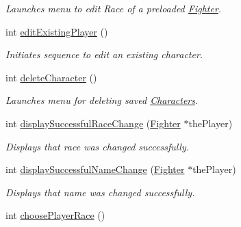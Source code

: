 \begin{DoxyCompactItemize}
\begin{DoxyCompactList}\small\item\em Launches menu to edit Race of a preloaded \hyperlink{class_fighter}{Fighter}. \end{DoxyCompactList}\item 
\hypertarget{class_game_loops_a113c1d86e74ed13427ce64438da0890a}{}\label{class_game_loops_a113c1d86e74ed13427ce64438da0890a} 
int \hyperlink{class_game_loops_a113c1d86e74ed13427ce64438da0890a}{edit\+Existing\+Player} ()
\begin{DoxyCompactList}\small\item\em Initiates sequence to edit an existing character. \end{DoxyCompactList}\item 
\hypertarget{class_game_loops_a8c82a46d75e472ae2fc76521c47e4e73}{}\label{class_game_loops_a8c82a46d75e472ae2fc76521c47e4e73} 
int \hyperlink{class_game_loops_a8c82a46d75e472ae2fc76521c47e4e73}{delete\+Character} ()
\begin{DoxyCompactList}\small\item\em Launches menu for deleting saved \hyperlink{class_characters}{Characters}. \end{DoxyCompactList}\item 
\hypertarget{class_game_loops_a1443019872f1a8082e896c7ca2f35b70}{}\label{class_game_loops_a1443019872f1a8082e896c7ca2f35b70} 
int \hyperlink{class_game_loops_a1443019872f1a8082e896c7ca2f35b70}{display\+Successful\+Race\+Change} (\hyperlink{class_fighter}{Fighter} $\ast$the\+Player)
\begin{DoxyCompactList}\small\item\em Displays that race was changed successfully. \end{DoxyCompactList}\item 
\hypertarget{class_game_loops_a0f9df340b1e499680db0a1943f8792f6}{}\label{class_game_loops_a0f9df340b1e499680db0a1943f8792f6} 
int \hyperlink{class_game_loops_a0f9df340b1e499680db0a1943f8792f6}{display\+Successful\+Name\+Change} (\hyperlink{class_fighter}{Fighter} $\ast$the\+Player)
\begin{DoxyCompactList}\small\item\em Displays that name was changed successfully. \end{DoxyCompactList}\item 
\hypertarget{class_game_loops_acc23c64d6568fe350e5140e857fc7ef0}{}\label{class_game_loops_acc23c64d6568fe350e5140e857fc7ef0} 
int \hyperlink{class_game_loops_acc23c64d6568fe350e5140e857fc7ef0}{choose\+Player\+Race} ()

\end{DoxyCompactItemize}

